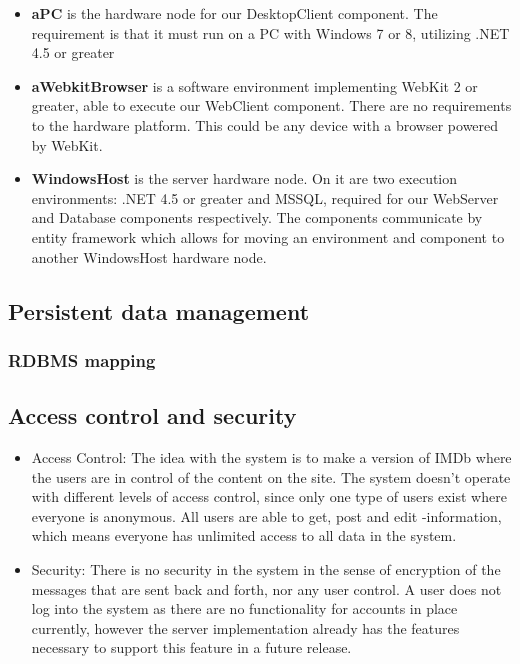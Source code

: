\begin{itemize}
\item \textbf{aPC} is the hardware node for our DesktopClient component. The requirement is that it must run on a PC with Windows 7 or 8, utilizing .NET 4.5 or greater
\item \textbf{aWebkitBrowser} is a software environment implementing WebKit 2 or greater, able to execute our WebClient component. There are no requirements to the hardware platform. This could be any device with a browser powered by WebKit.
\item \textbf{WindowsHost} is the server hardware node. On it are two execution environments: .NET 4.5 or greater and MSSQL, required for our WebServer and Database components respectively. The components communicate by entity framework which allows for moving an environment and component to another WindowsHost hardware node.
\end{itemize}

\subsection{Persistent data management}

\subsubsection{RDBMS mapping}

\subsection{Access control and security}
\begin{itemize}
\item Access Control: The idea with the system is to make a version of IMDb where the users are in control of the content on the site. The system doesn't operate with different levels of access control, since only one type of users exist where everyone is anonymous. All users are able to get, post and edit -information, which means everyone has unlimited access to all data in the system.\\
\item Security: There is no security in the system in the sense of encryption of the messages that are sent back and forth, nor any user control. A user does not log into the system as there are no functionality for accounts in place currently, however the server implementation already has the features necessary to support this feature in a future release.
\end{itemize}

